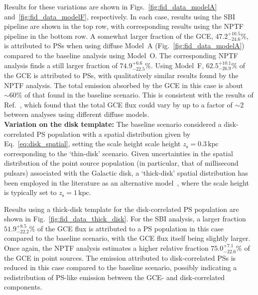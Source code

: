 \documentclass[prd,aps,10pt,nofootinbib,twocolumn,superscriptaddress,preprintnumbers,balancelastpage,longbibliography,floatfix]{revtex4-2}
\begin{document}
Results for these variations are shown in Figs.~\ref{fig:fid_data_modelA} and~\ref{fig:fid_data_modelF}, respectively. In each case, results using the SBI pipeline are shown in the top row, with corresponding results using the NPTF pipeline in the bottom row. 
A somewhat larger fraction of the GCE, $47.2^{+10.5}_{-24.6}\%$, is attributed to PSs when using diffuse {Model~A} (Fig.~\ref{fig:fid_data_modelA}) compared to the baseline analysis using {Model~O}. The corresponding NPTF analysis finds a still larger fraction of $74.9^{+6.6}_{-22.5}\%$. Using {Model~F}, $62.5^{+10.1}_{-26.9}\%$ of the GCE is attributed to PSs, with qualitatively similar results found by the NPTF analysis. The total emission absorbed by the GCE in this case is about $\sim 60\%$ of that found in the baseline scenario. This is consistent with the results of Ref.~\cite{Buschmann:2020adf}, which found that the total GCE flux could vary by up to a factor of $\sim 2$ between analyses using different diffuse models. \\

\noindent
\textbf{Variation on the disk template:}
The baseline scenario considered a disk-correlated PS population with a spatial distribution given by Eq.~\eqref{eq:disk_spatial}, setting the scale height scale height $z_\mathrm{s} = 0.3\,\mathrm{kpc}$ corresponding to the `thin-disk' scenario. Given uncertainties in the spatial distribution of the point source population (in particular, that of millisecond pulsars) associated with the Galactic disk, a `thick-disk' spatial distribution has been employed in the literature as an alternative model~\cite{Lee:2015fea,Leane:2019xiy,Buschmann:2020adf}, where the scale height is typically set to $z_\mathrm{s} = 1\,\mathrm{kpc}$. 

Results using a thick-disk template for the disk-correlated PS population are shown in Fig.~\ref{fig:fid_data_thick_disk}. For the SBI analysis, a larger fraction $51.9^{+8.5}_{-22.2}\%$ of the GCE flux is attributed to a PS population in this case compared to the baseline scenario, with the GCE flux itself being slightly larger. Once again, the NPTF analysis estimates a higher relative fraction $75.0^{+7.1}_{-22.6}\%$ of the GCE in point sources. The emission attributed to disk-correlated PSs is reduced in this case compared to the baseline scenario, possibly indicating a redistribution of PS-like emission between the GCE- and disk-correlated components. \\
\end{document}
